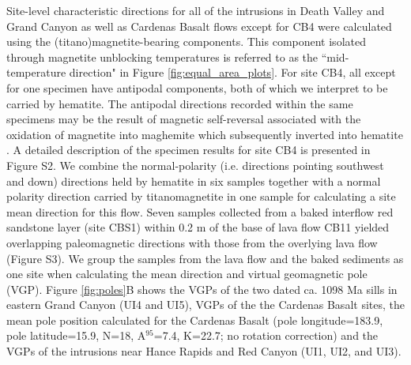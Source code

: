 \documentclass[draft]{agujournal2019}
\begin{document}
Site-level characteristic directions for all of the intrusions in Death Valley and Grand Canyon as well as Cardenas Basalt flows except for CB4 were calculated using the (titano)magnetite-bearing components. This component isolated through magnetite unblocking temperatures is referred to as the ``mid-temperature direction" in Figure \ref{fig:equal_area_plots}. For site CB4, all except for one specimen have antipodal components, both of which we interpret to be carried by hematite. The antipodal directions recorded within the same specimens may be the result of magnetic self-reversal associated with the oxidation of magnetite into maghemite which subsequently inverted into hematite \cite{Swanson-Hysell2011a}. A detailed description of the specimen results for site CB4 is presented in Figure S2. We combine the normal-polarity (i.e. directions pointing southwest and down) directions held by hematite in six samples together with a normal polarity direction carried by titanomagnetite in one sample for calculating a site mean direction for this flow. Seven samples collected from a baked interflow red sandstone layer (site CBS1) within 0.2 m of the base of lava flow CB11 yielded overlapping paleomagnetic directions with those from the overlying lava flow (Figure S3). We group the samples from the lava flow and the baked sediments as one site when calculating the mean direction and virtual geomagnetic pole (VGP). Figure \ref{fig:poles}B shows the VGPs of the two dated ca. 1098 Ma sills in eastern Grand Canyon (UI4 and UI5), VGPs of the the Cardenas Basalt sites, the mean pole position calculated for the Cardenas Basalt (pole longitude=183.9\textdegree, pole latitude=15.9\textdegree, N=18, A$^{95}$=7.4\textdegree, K=22.7; no rotation correction) and the VGPs of the intrusions near Hance Rapids and Red Canyon (UI1, UI2, and UI3). 
\end{document}
